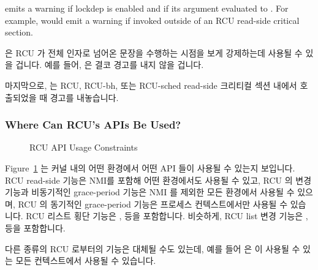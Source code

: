  emits a warning if lockdep is enabled and if
its argument evaluated to .
For example,  would emit a
warning if invoked outside of an RCU read-side critical section.
\fi

 은 RCU 가 전체 인자로 넘어온 문장을 수행하는 시점을 보게
강제하는데 사용될 수 있을 겁니다.
예를 들어,  은 결코 경고를 내지
않을 겁니다.

마지막으로,  는 RCU, RCU-bh, 또는 RCU-sched read-side
크리티컬 섹션 내에서 호출되었을 때 경고를 내놓습니다.

\subsubsection{Where Can RCU's APIs Be Used?}
\label{sec:defer:Where Can RCU's APIs Be Used?}

\begin{figure}[tb]
\begin{center}
\end{center}
\caption{RCU API Usage Constraints}
\label{fig:defer:RCU API Usage Constraints}
\end{figure}

Figure~\ref{fig:defer:RCU API Usage Constraints}
는 커널 내의 어떤 환경에서 어떤 API 들이 사용될 수 있는지 보입니다.
RCU read-side 기능은 NMI를 포함해 어떤 환경에서도 사용될 수 있고, RCU 의 변경
기능과 비동기적인 grace-period 기능은 NMI 를 제외한 모든 환경에서 사용될 수
있으며, RCU 의 동기적인 grace-period 기능은 프로세스 컨텍스트에서만 사용될 수
있습니다.
RCU 리스트 횡단 기능은 ,
 등을 포함합니다.
비슷하게, RCU list 변경 기능은 ,  등을
포함합니다.

다른 종류의 RCU 로부터의 기능은 대체될 수도 있는데, 예를 들어
 은  이 사용될 수 있는 모든
컨텍스트에서 사용될 수 있습니다.
\iffalse

